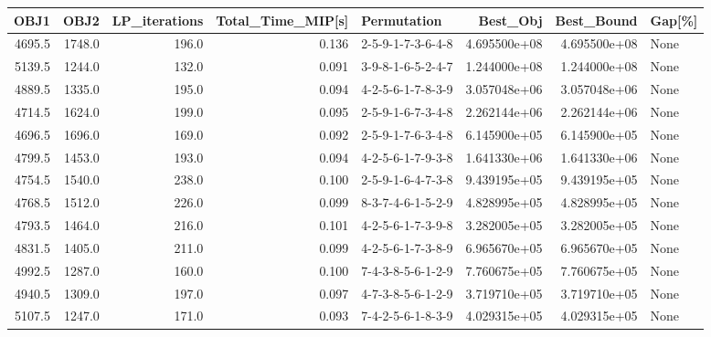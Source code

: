 \begin{tabular}{rrrrlrrl}
\toprule
   OBJ1 &    OBJ2 &  LP\_iterations &  Total\_Time\_MIP[s] &        Permutation &      Best\_Obj &    Best\_Bound & Gap[\%] \\
\midrule
 4695.5 &  1748.0 &          196.0 &              0.136 &  2-5-9-1-7-3-6-4-8 &  4.695500e+08 &  4.695500e+08 &   None \\
 5139.5 &  1244.0 &          132.0 &              0.091 &  3-9-8-1-6-5-2-4-7 &  1.244000e+08 &  1.244000e+08 &   None \\
 4889.5 &  1335.0 &          195.0 &              0.094 &  4-2-5-6-1-7-8-3-9 &  3.057048e+06 &  3.057048e+06 &   None \\
 4714.5 &  1624.0 &          199.0 &              0.095 &  2-5-9-1-6-7-3-4-8 &  2.262144e+06 &  2.262144e+06 &   None \\
 4696.5 &  1696.0 &          169.0 &              0.092 &  2-5-9-1-7-6-3-4-8 &  6.145900e+05 &  6.145900e+05 &   None \\
 4799.5 &  1453.0 &          193.0 &              0.094 &  4-2-5-6-1-7-9-3-8 &  1.641330e+06 &  1.641330e+06 &   None \\
 4754.5 &  1540.0 &          238.0 &              0.100 &  2-5-9-1-6-4-7-3-8 &  9.439195e+05 &  9.439195e+05 &   None \\
 4768.5 &  1512.0 &          226.0 &              0.099 &  8-3-7-4-6-1-5-2-9 &  4.828995e+05 &  4.828995e+05 &   None \\
 4793.5 &  1464.0 &          216.0 &              0.101 &  4-2-5-6-1-7-3-9-8 &  3.282005e+05 &  3.282005e+05 &   None \\
 4831.5 &  1405.0 &          211.0 &              0.099 &  4-2-5-6-1-7-3-8-9 &  6.965670e+05 &  6.965670e+05 &   None \\
 4992.5 &  1287.0 &          160.0 &              0.100 &  7-4-3-8-5-6-1-2-9 &  7.760675e+05 &  7.760675e+05 &   None \\
 4940.5 &  1309.0 &          197.0 &              0.097 &  4-7-3-8-5-6-1-2-9 &  3.719710e+05 &  3.719710e+05 &   None \\
 5107.5 &  1247.0 &          171.0 &              0.093 &  7-4-2-5-6-1-8-3-9 &  4.029315e+05 &  4.029315e+05 &   None \\
\bottomrule
\end{tabular}
